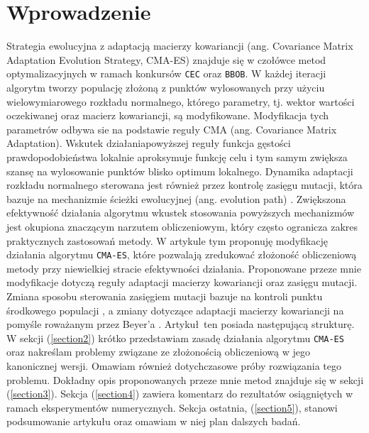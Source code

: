 \section{Wprowadzenie}
Strategia ewolucyjna z adaptacją macierzy kowariancji (ang. Covariance Matrix Adaptation Evolution Strategy, CMA-ES) \cite{cma-es} znajduje się w czołówce metod optymalizacyjnych w ramach konkursów \texttt{CEC} oraz \texttt{BBOB}. W każdej iteracji algorytm tworzy populację złożoną z punktów wylosowanych przy użyciu wielowymiarowego rozkładu normalnego, którego parametry, tj. wektor wartości oczekiwanej oraz macierz kowariancji, są modyfikowane. Modyfikacja tych parametrów odbywa sie na podstawie reguły CMA (ang. Covariance Matrix Adaptation). Wskutek działaniapowyższej reguły funkcja gęstości prawdopodobieństwa lokalnie aproksymuje funkcję celu i tym samym zwiększa szansę na wylosowanie punktów blisko optimum lokalnego. Dynamika adaptacji rozkładu normalnego sterowana jest również przez kontrolę zasięgu mutacji, która bazuje na mechanizmie ścieżki ewolucyjnej (ang. evolution path) \cite{evol-path}. Zwiększona efektywność działania algorytmu wkustek stosowania powyższych mechanizmów jest okupiona znaczącym narzutem obliczeniowym, który często ogranicza zakres praktycznych zastosowań metody.
W artykule tym proponuję modyfikację działania algorytmu \texttt{CMA-ES}, które pozwalają zredukować złożoność obliczeniową metody przy niewielkiej stracie efektywności działania. Proponowane przeze mnie modyfikacje dotyczą reguły adaptacji macierzy kowariancji oraz zasięgu mutacji. Zmiana sposobu sterowania zasięgiem mutacji bazuje na kontroli punktu środkowego populacji \cite{midpoint}, a zmiany dotyczące adaptacji macierzy kowariancji na pomyśle roważanym przez Beyer'a \cite{simplify-covariance-matrix}.
Artykuł ten posiada następującą strukturę. W sekcji (\ref{section2}) krótko przedstawiam zasadę działania algorytmu \texttt{CMA-ES} oraz nakreślam problemy związane ze złożonością obliczeniową w jego kanonicznej wersji. Omawiam również dotychczasowe próby rozwiązania tego problemu. Dokładny opis proponowanych przeze mnie metod znajduje się w sekcji (\ref{section3}). Sekcja (\ref{section4}) zawiera komentarz do rezultatów osiągniętych w ramach eksperymentów numerycznych. Sekcja ostatnia, (\ref{section5}), stanowi podsumowanie artykułu oraz omawiam w niej plan dalszych badań. 
